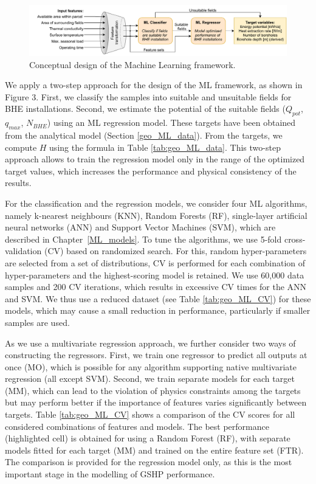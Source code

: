 \begin{figure}[tb]
\centering\includegraphics[width=\linewidth]{images/Figs/ML_PV.pdf}
\caption{Conceptual design of the Machine Learning framework.}
\label{fig:geo_ML_framework}
\end{figure}

We apply a two-step approach for the design of the ML framework, as shown in Figure 3. First, we classify the samples into suitable and unsuitable fields for BHE installations. Second, we estimate the potential of the suitable fields ($Q_{pot}$, $q_{max}$, $N_{BHE}$) using an ML regression model. These targets have been obtained from the analytical model (Section \ref{geo_ML_data}). From the targets, we compute $H$ using the formula in Table \ref{tab:geo_ML_data}. This two-step approach allows to train the regression model only in the range of the optimized target values, which increases the performance and physical consistency of the results. 

For the classification and the regression models, we consider four ML algorithms, namely k-nearest neighbours (KNN), Random Forests (RF), single-layer artificial neural networks (ANN) and Support Vector Machines (SVM), which are described in Chapter~\ref{ML_models}. 
To tune the algorithms, we use 5-fold cross-validation (CV) based on randomized search. 
For this, random hyper-parameters are selected from a set of distributions, CV is performed for each combination of hyper-parameters and the highest-scoring model is retained. 
We use 60,000 data samples and 200 CV iterations, which results in excessive CV times for the ANN and SVM. 
We thus use a reduced dataset (see Table \ref{tab:geo_ML_CV}) for these models, which may cause a small reduction in performance, particularly if smaller samples are used.

As we use a multivariate regression approach, we further consider two ways of constructing the regressors. First, we train one regressor to predict all outputs at once (MO), which is possible for any algorithm supporting native multivariate regression (all except SVM). Second, we train separate models for each target (MM), which can lead to the violation of physics constraints among the targets but may perform better if the importance of features varies significantly between targets. Table \ref{tab:geo_ML_CV} shows a comparison of the CV scores for all considered combinations of features and models. The best performance (highlighted cell) is obtained for using a Random Forest (RF), with separate models fitted for each target (MM) and trained on the entire feature set (FTR). The comparison is provided for the regression model only, as this is the most important stage in the modelling of GSHP performance. 

